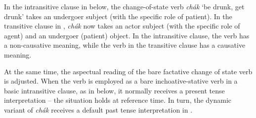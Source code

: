 In the intransitive clause in  below, the change-of-state verb \textit{chák} ‘be drunk, get drunk’ takes an undergoer subject (with the specific role of patient). In the transitive clause in , \textit{chák} now takes an actor subject (with the specific role of agent) and an undergoer (patient) object. In the intransitive clause, the verb has a non-causative meaning, while the verb in the transitive clause has a causative meaning. 


At the same time, the aspectual reading of the bare factative change of state verb is adjusted. When the verb is employed as a bare inchoative-stative verb in a basic intransitive clause, as in  below, it normally receives a present tense interpretation – the situation holds at reference time. In turn, the dynamic variant of \textit{chák} receives a default past tense interpretation in . 



